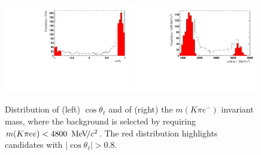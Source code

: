 \begin{figure}[t!]
\centering
\includegraphics[width=0.49\textwidth]{RKst/figs/misreco/CosThetaL_background.pdf}
\includegraphics[width=0.49\textwidth]{RKst/figs/misreco/KstareMass_background.pdf}
\caption{Distribution of (left) $\cos \theta_\ell$ and of (right) the $m(K\pi e^-)$ invariant mass, where the  background is selected by requiring $m(K\pi ee) < 4800~\mevcc$. The red distribution highlights candidates with $| \cos \theta_\ell | > 0.8$.}
\label{fig:Denu_background}
\end{figure}

\subsubsection{\BdToKstGee}

